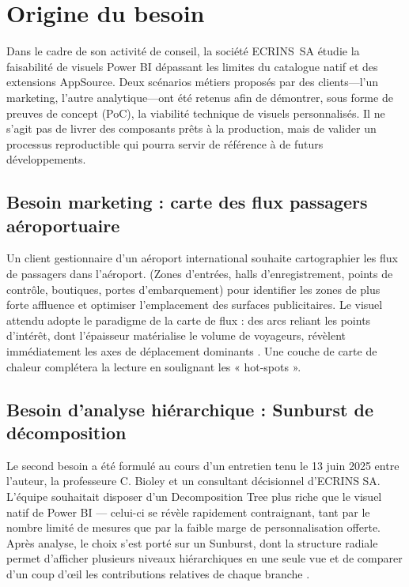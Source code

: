 \section{Origine du besoin}
\label{sec:need-origin}

Dans le cadre de son activité de conseil, la société ECRINS~SA étudie la
faisabilité de visuels Power BI dépassant les limites du catalogue
natif et des extensions AppSource.  
Deux scénarios métiers proposés par des clients—l’un marketing, l’autre
analytique—ont été retenus afin de démontrer, sous forme de
preuves de concept (PoC), la viabilité technique de visuels
personnalisés.  
Il ne s’agit pas de livrer des composants prêts à la production, mais de
valider un processus reproductible qui pourra servir de référence à de
futurs développements.

\subsection{Besoin marketing : carte des flux passagers aéroportuaire}
\label{subsec:need-marketing-flow}

Un client gestionnaire d’un aéroport international souhaite
cartographier les flux de passagers dans l'aéroport. 
(Zones d'entrées, halls d’enregistrement, points de contrôle, boutiques,
portes d’embarquement) pour identifier les zones de plus forte
affluence et optimiser l’emplacement des surfaces publicitaires.  
Le visuel attendu adopte le paradigme de la carte de flux : des arcs
reliant les points d’intérêt, dont l’épaisseur matérialise le volume de
voyageurs, révèlent immédiatement les axes de déplacement dominants
\parencite{GuoFlowMaps2011}.  
Une couche de carte de chaleur complétera la lecture en soulignant les
« hot-spots ».  


\subsection{Besoin d’analyse hiérarchique : Sunburst de décomposition}
\label{subsec:need-hierarchical-sunburst}

Le second besoin a été formulé au cours d’un entretien tenu le 13 juin 2025 entre l’auteur, la professeure C. Bioley et un consultant décisionnel d’ECRINS SA.
L’équipe souhaitait disposer d’un Decomposition Tree plus riche que le visuel natif de Power BI — celui-ci se révèle rapidement contraignant, tant par le nombre limité de mesures que par la faible marge de personnalisation offerte. 
Après analyse, le choix s’est porté sur un Sunburst, dont la structure radiale permet d’afficher plusieurs niveaux hiérarchiques en une seule vue et de comparer d’un coup d’œil les contributions relatives de chaque branche \parencite{StaskoSunburst2000}. 

